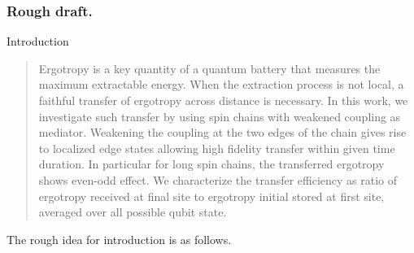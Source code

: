 \documentclass[../../../main.tex]{subfiles}
\begin{document}
\subsubsection{Rough draft.} Introduction
\begin{quote}
  Ergotropy is a key quantity of a quantum battery that measures the maximum extractable energy. When the extraction process is not local, a faithful transfer of ergotropy across distance is necessary. In this work, we investigate such transfer by using spin chains with weakened coupling as mediator. Weakening the coupling at the two edges of the chain gives rise to localized edge states allowing high fidelity transfer within given time duration. In particular for long spin chains, the transferred ergotropy shows even-odd effect. 
  We characterize the transfer efficiency as ratio of ergotropy received at final site to ergotropy initial stored at first site, averaged over all possible qubit state.
\end{quote}
The rough idea for introduction is as follows.
\end{document}
